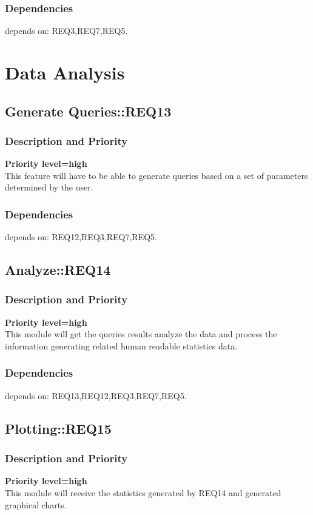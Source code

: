 \documentclass{scrreprt}
\begin{document}
\subsubsection{Dependencies}
depends on: REQ3,REQ7,REQ5.

\newpage



\section{Data Analysis}

\subsection{Generate Queries::REQ13}
\subsubsection{Description and Priority}
\textbf{Priority level=high}\\
This feature will have to be able to generate queries based on a set of
parameters determined by the user.
\subsubsection{Dependencies}
depends on: REQ12,REQ3,REQ7,REQ5.


\subsection{Analyze::REQ14}
\subsubsection{Description and Priority}
\textbf{Priority level=high}\\
This module will get the queries results analyze the data and process the
information generating related human readable statistics data.
\subsubsection{Dependencies}
depends on: REQ13,REQ12,REQ3,REQ7,REQ5.

\subsection{Plotting::REQ15}
\subsubsection{Description and Priority}
\textbf{Priority level=high}\\
This module will receive the statistics generated by REQ14 and generated
graphical charts.
\end{document}
